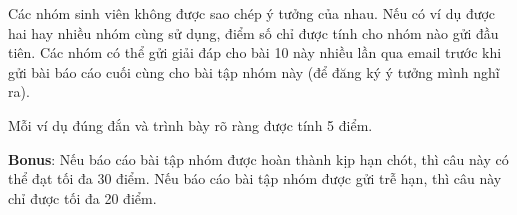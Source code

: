 \documentclass[12pt]{article}
\begin{document}
Các nhóm sinh viên không được sao chép ý tưởng của nhau. Nếu có ví dụ được hai hay nhiều nhóm cùng sử dụng, điểm số chỉ được tính cho nhóm nào gửi đầu tiên. Các nhóm có thể gửi giải đáp cho bài 10 này nhiều lần qua email trước khi gửi bài báo cáo cuối cùng cho bài tập nhóm này (để đăng ký ý tưởng mình nghĩ ra).

Mỗi ví dụ đúng đắn và trình bày rõ ràng được tính 5 điểm.

\textbf{Bonus}: Nếu báo cáo bài tập nhóm được hoàn thành kịp hạn chót, thì câu này có thể đạt tối đa 30 điểm. Nếu báo cáo bài tập nhóm được gửi trễ hạn, thì câu này chỉ được tối đa 20 điểm.
\end{document}

